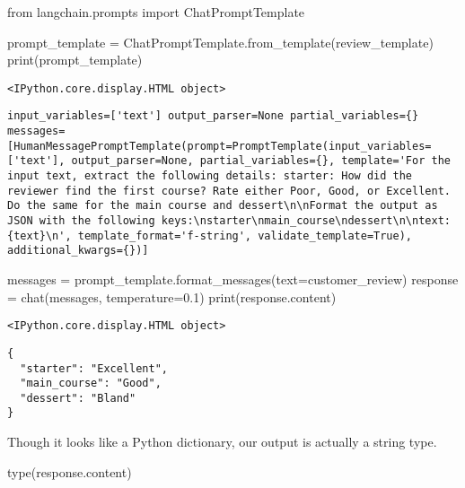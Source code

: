 \documentclass[
  letterpaper,
  DIV=11,
  numbers=noendperiod]{scrreprt}
\newenvironment{Shaded}{\begin{snugshade}}{\end{snugshade}}
\newcommand{\BuiltInTok}[1]{\textcolor[rgb]{0.00,0.23,0.31}{#1}}
\newcommand{\FloatTok}[1]{\textcolor[rgb]{0.68,0.00,0.00}{#1}}
\newcommand{\ImportTok}[1]{\textcolor[rgb]{0.00,0.46,0.62}{#1}}
\newcommand{\NormalTok}[1]{\textcolor[rgb]{0.00,0.23,0.31}{#1}}
\newcommand{\OperatorTok}[1]{\textcolor[rgb]{0.37,0.37,0.37}{#1}}
\begin{document}
\begin{Shaded}
\begin{Highlighting}[]
\ImportTok{from}\NormalTok{ langchain.prompts }\ImportTok{import}\NormalTok{ ChatPromptTemplate}

\NormalTok{prompt\_template }\OperatorTok{=}\NormalTok{ ChatPromptTemplate.from\_template(review\_template)}
\BuiltInTok{print}\NormalTok{(prompt\_template)}
\end{Highlighting}
\end{Shaded}

\begin{verbatim}
<IPython.core.display.HTML object>
\end{verbatim}

\begin{verbatim}
input_variables=['text'] output_parser=None partial_variables={} messages=[HumanMessagePromptTemplate(prompt=PromptTemplate(input_variables=['text'], output_parser=None, partial_variables={}, template='For the input text, extract the following details: starter: How did the reviewer find the first course? Rate either Poor, Good, or Excellent. Do the same for the main course and dessert\n\nFormat the output as JSON with the following keys:\nstarter\nmain_course\ndessert\n\ntext: {text}\n', template_format='f-string', validate_template=True), additional_kwargs={})]
\end{verbatim}

\begin{Shaded}
\begin{Highlighting}[]
\NormalTok{messages }\OperatorTok{=}\NormalTok{ prompt\_template.format\_messages(text}\OperatorTok{=}\NormalTok{customer\_review)}
\NormalTok{response }\OperatorTok{=}\NormalTok{ chat(messages, temperature}\OperatorTok{=}\FloatTok{0.1}\NormalTok{)}
\BuiltInTok{print}\NormalTok{(response.content)}
\end{Highlighting}
\end{Shaded}

\begin{verbatim}
<IPython.core.display.HTML object>
\end{verbatim}

\begin{verbatim}
{
  "starter": "Excellent",
  "main_course": "Good",
  "dessert": "Bland"
}
\end{verbatim}

Though it looks like a Python dictionary, our output is actually a
string type.

\begin{Shaded}
\begin{Highlighting}[]
\BuiltInTok{type}\NormalTok{(response.content)}
\end{Highlighting}
\end{Shaded}
\end{document}
